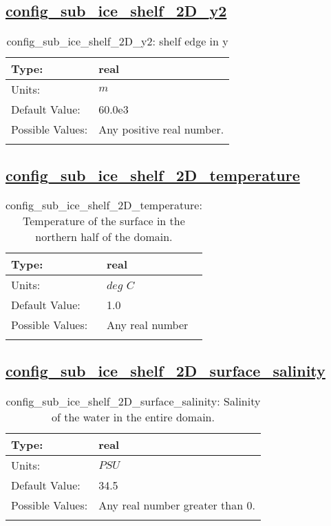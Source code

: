 \subsection[config\_sub\_ice\_shelf\_2D\_y2]{\hyperref[sec:nm_tab_sub_ice_shelf_2D]{config\_sub\_ice\_shelf\_2D\_y2}}
\label{subsec:nm_sec_config_sub_ice_shelf_2D_y2}
\begin{center}
\begin{longtable}{| p{2.0in} || p{4.0in} |}
    \hline
    Type: & real \\
    \hline
    Units: & $m$ \\
    \hline
    Default Value: & 60.0e3 \\
    \hline
    Possible Values: & Any positive real number. \\
    \hline
    \caption{config\_sub\_ice\_shelf\_2D\_y2: shelf edge in y}
\end{longtable}
\end{center}
\subsection[config\_sub\_ice\_shelf\_2D\_temperature]{\hyperref[sec:nm_tab_sub_ice_shelf_2D]{config\_sub\_ice\_shelf\_2D\_temperature}}
\label{subsec:nm_sec_config_sub_ice_shelf_2D_temperature}
\begin{center}
\begin{longtable}{| p{2.0in} || p{4.0in} |}
    \hline
    Type: & real \\
    \hline
    Units: & $deg$ $C$ \\
    \hline
    Default Value: & 1.0 \\
    \hline
    Possible Values: & Any real number \\
    \hline
    \caption{config\_sub\_ice\_shelf\_2D\_temperature: Temperature of the surface in the northern half of the domain.}
\end{longtable}
\end{center}
\subsection[config\_sub\_ice\_shelf\_2D\_surface\_salinity]{\hyperref[sec:nm_tab_sub_ice_shelf_2D]{config\_sub\_ice\_shelf\_2D\_surface\_salinity}}
\label{subsec:nm_sec_config_sub_ice_shelf_2D_surface_salinity}
\begin{center}
\begin{longtable}{| p{2.0in} || p{4.0in} |}
    \hline
    Type: & real \\
    \hline
    Units: & $PSU$ \\
    \hline
    Default Value: & 34.5 \\
    \hline
    Possible Values: & Any real number greater than 0. \\
    \hline
    \caption{config\_sub\_ice\_shelf\_2D\_surface\_salinity: Salinity of the water in the entire domain.}
\end{longtable}
\end{center}
